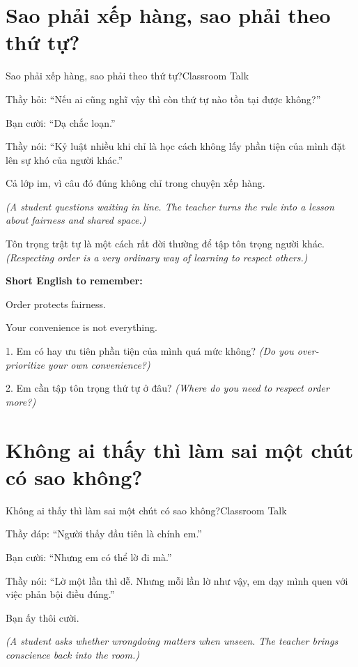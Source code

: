 \section{Sao phải xếp hàng, sao phải theo thứ tự?}
\begin{truyen}{Sao phải xếp hàng, sao phải theo thứ tự?}{Classroom Talk}

Thầy hỏi: ``Nếu ai cũng nghĩ vậy thì còn thứ tự nào tồn tại được không?''

Bạn cười: ``Dạ chắc loạn.''

Thầy nói: ``Kỷ luật nhiều khi chỉ là học cách không lấy phần tiện của mình đặt lên sự khó của người khác.''

Cả lớp im, vì câu đó đúng không chỉ trong chuyện xếp hàng.

\textit{(A student questions waiting in line. The teacher turns the rule into a lesson about fairness and shared space.)}
\end{truyen}

\begin{baihoc}
Tôn trọng trật tự là một cách rất đời thường để tập tôn trọng người khác.
\textit{(Respecting order is a very ordinary way of learning to respect others.)}
\end{baihoc}

\begin{ghinhoanh}
\textbf{Short English to remember:}

Order protects fairness.

Your convenience is not everything.
\end{ghinhoanh}

\begin{tuhocnhanh}
1. Em có hay ưu tiên phần tiện của mình quá mức không? \textit{(Do you over-prioritize your own convenience?)}

2. Em cần tập tôn trọng thứ tự ở đâu? \textit{(Where do you need to respect order more?)}
\end{tuhocnhanh}
\ngancach

\section{Không ai thấy thì làm sai một chút có sao không?}
\begin{truyen}{Không ai thấy thì làm sai một chút có sao không?}{Classroom Talk}

Thầy đáp: ``Người thấy đầu tiên là chính em.''

Bạn cười: ``Nhưng em có thể lờ đi mà.''

Thầy nói: ``Lờ một lần thì dễ. Nhưng mỗi lần lờ như vậy, em dạy mình quen với việc phản bội điều đúng.''

Bạn ấy thôi cười.

\textit{(A student asks whether wrongdoing matters when unseen. The teacher brings conscience back into the room.)}
\end{truyen}

